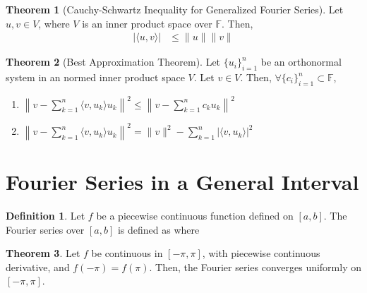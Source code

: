 \documentclass[fleqn, 8pt]{amsart}
\theoremstyle{definition}
\newtheorem{definition}{Definition}
\theoremstyle{theorem}
\newtheorem{theorem}{Theorem}
\begin{document}
\begin{multicols}{2}
\begin{spacing}{0.7}
\begin{theorem}[Cauchy-Schwartz Inequality for Generalized Fourier Series]
	Let $u,v \in V$, where $V$ is an inner product space over $\mathbb{F}$.
	Then,
	\begin{align*}
		\left| \langle u,v \rangle \right| &\le \|u\| \|v\|
	\end{align*}
	\label{thm:Cauchy-Schwartz_Inequality_for_Generalized_Fourier_Series}
\end{theorem}

\begin{theorem}[Best Approximation Theorem]
	Let $\{u_i\}_{i = 1}^{n}$ be an orthonormal system in an normed inner product space $V$.
	Let $v \in V$.
	Then, $\forall \{c_i\}_{i = 1}^{n} \subset \mathbb{F}$,
	\begin{enumerate}
		\item $\left\| v - \sum\limits_{k = 1}^{n} \langle v,u_k \rangle u_k \right\|^2 \le \left\| v - \sum\limits_{k = 1}^{n} c_k u_k \right\|^2$
		\item $\left\| v - \sum\limits_{k = 1}^{n} \langle v,u_k \rangle u_k \right\|^2 = \|v\|^2 -  \sum\limits_{k = 1}^{n} \left| \langle v,u_k \rangle \right|^2$
	\end{enumerate}
	\label{thm:Best_Approximation_Theorem}
\end{theorem}

\section{Fourier Series in a General Interval}

\begin{definition}
	Let $f$ be a piecewise continuous function defined on $[a,b]$.
	The Fourier series over $[a,b]$ is defined as
	where
\end{definition}

\begin{theorem}
	Let $f$ be continuous in $[-\pi,\pi]$, with piecewise continuous derivative, and $f(-\pi) = f(\pi)$.
	Then, the Fourier series converges uniformly on $[-\pi,\pi]$.
\end{theorem}


\end{spacing}
\end{multicols}
\end{document}
